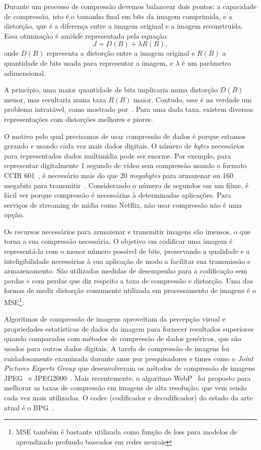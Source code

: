 Durante um processo de compressão devemos balancear dois pontos: a capacidade de compressão, isto é,o tamanho final em bits da imagem comprimida, e a distorção, que é a diferença entre a imagem original e a imagem reconstruída. Essa otimização é amiúde representada pela equação: $$ J = D(B) + \lambda R(B), $$ onde $D(B)$ representa a distorção entre a imagem original e $R(B)$ a quantidade de bits usada para representar a imagem, e $\lambda$ é um parâmetro adimensional.
    
A princípio, uma maior quantidade de bits implicaria numa distorção $D(B)$ menor, mas resultaria numa taxa $R(B)$ maior. Contudo, esse é na verdade um problema intratável, como mostrado por~\cite{shoham1988efficient}. Para uma dada taxa, existem diversas representações com distorções melhores e piores.

O motivo pelo qual precisamos de usar compressão de dados é porque estamos gerando e usando cada vez mais dados digitais. O número de \textit{bytes} necessários para representados dados multimídia pode ser enorme. Por exemplo, para representar digitalmente 1 segundo de vídeo sem compressão usando o formato CCIR 601~\cite{sayood2017introduction}, é necessário mais do que 20 \textit{megabytes} para armazenar ou 160 megabits para transmitir~\cite{sayood2017introduction}. Considerando o número de segundos em um filme, é fácil ver porque compressão é necessárias à determinadas aplicações. Para serviços de streaming de mídia como Netflix, não usar compressão não é uma opção.

Os recursos necessários para armazenar e transmitir imagens são imensos, o que torna a sua compressão necessária. O objetivo em codificar uma imagem é representá-la com o menor número possível de bits, preservando a qualidade e a inteligibilidade necessárias à sua aplicação de modo a facilitar sua transmissão e armazenamento. São utilizadas medidas de desempenho para a codificação sem perdas e com perdas que diz respeito a taxa de compressão e distorção. Uma das formas de medir distorção comumente utilizada em processamento de imagens é o \acrshort{MSE}\footnote{MSE também é bastante utilizada como função de loss para modelos de aprendizado profundo baseados em redes neurais}: 

Algoritmos de compressão de imagens aproveitam da percepção visual e propriedades estatísticas de dados da imagem para fornecer resultados superiores quando comparados com métodos de compressão de dados genéricos, que são usados para outros dados digitais. A tarefa de compressão de imagens foi cuidadosamente examinada durante anos por pesquisadores e times como o \textit{Joint Pictures Experts Group} que desenvolveram os métodos de compressão de imagens JPEG~\cite{jpeg1993} e JPEG2000~\cite{jpeg2000}. Mais recentemente, o algoritmo WebP~\cite{webp} foi proposto para melhorar as taxas de compressão em imagens de alta resolução, que vem sendo cada vez mais utilizadas. O codec (codificador e decodificador) do estado da arte atual é o BPG~\cite{bpg}.


